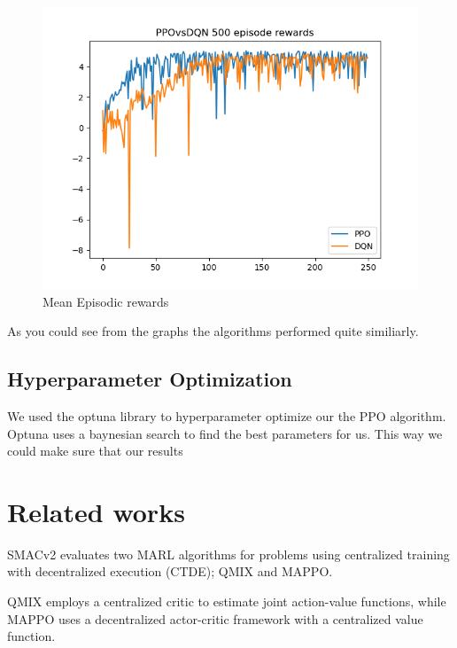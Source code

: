\documentclass[conference]{IEEEtran}
\begin{document}
	\begin{figure}[h!]
		\includegraphics[width=\columnwidth]{graphs/PPOvsDQN250.png}
		\caption{Mean Episodic rewards}
	\end{figure}

	As you could see from the graphs the algorithms performed quite similiarly.

	\subsection{Hyperparameter Optimization}
	We used the optuna library to hyperparameter optimize our the PPO algorithm. Optuna uses a baynesian search to find the best parameters for us. This way we could make sure that our results




	\section{Related works}
	SMACv2\cite{ellis2022smacv2} evaluates two MARL algorithms for problems using centralized training with
	decentralized execution (CTDE); QMIX and MAPPO.

	QMIX employs a centralized critic to estimate joint action-value functions, while MAPPO uses a decentralized
	actor-critic framework with a centralized value function.
\end{document}
